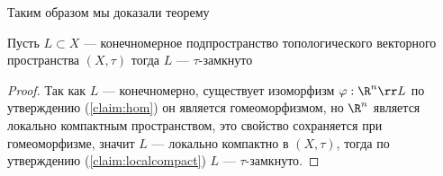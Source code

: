 Таким образом мы доказали теорему
\begin{theorem}
	\label{th:clfinds}
	Пусть $L \subset X$ --- конечномерное подпространство топологического векторного пространства $(X, \tau)$ тогда $L$ --- $\tau$-замкнуто
\end{theorem}
\begin{proof}
	Так как $L$ --- конечномерно, существует изоморфизм $\varphi: \R^n \rr L$ по утверждению (\ref{claim:hom}) он является гомеоморфизмом, но $\R^n$ является локально компактным пространством, это свойство сохраняется при гомеоморфизме, значит $L$ --- локально компактно в $(X, \tau)$, тогда по утверждению (\ref{claim:localcompact}) $L$ --- $\tau$-замкнуто.
\end{proof}
